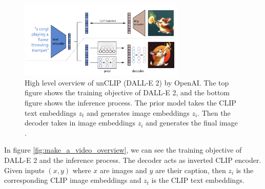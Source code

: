 \begin{figure}
    \centering
    \includegraphics[width=0.7\textwidth]{images/make_a_video/dalle_2.png}
    \caption{High level overview of unCLIP (DALL-E 2) \cite{dalle_2} by OpenAI. The top figure shows the training objective of DALL-E 2, and the bottom figure shows the inference process. The prior model takes the CLIP text embeddings $z_t$ and generates image embeddings $z_i$. Then the decoder takes in image embeddings $z_i$ and generates the final image \cite{make_a_video}.}
    \label{fig:make_a_video_dalle2_overview}
\end{figure}

In figure \ref{fig:make_a_video_overview}, we can see the training objective of DALL-E 2 and the inference process. The decoder acts as inverted CLIP encoder. Given inputs $(x, y)$ where $x$ are images and $y$ are their caption, then $z_i$ is the corresponding CLIP image embeddings and $z_t$ is the CLIP text embeddings.


